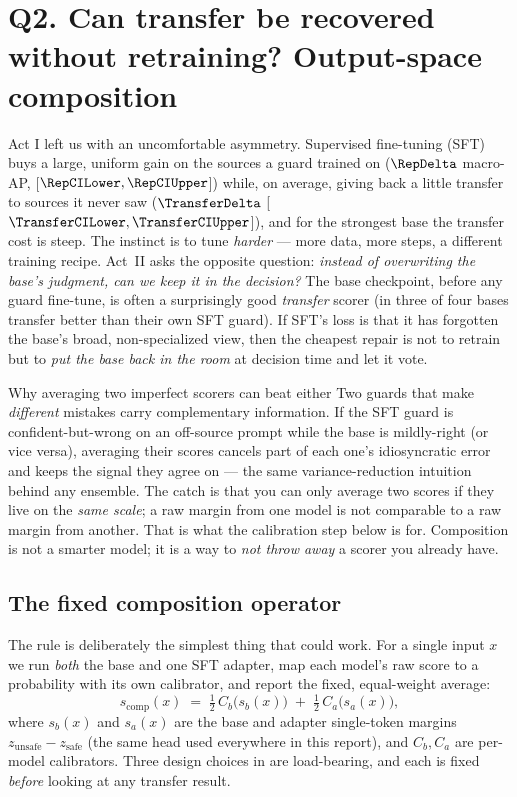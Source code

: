 \section{Q2. Can transfer be recovered without retraining? Output-space composition}
\label{sec:actIII}

Act I left us with an uncomfortable asymmetry. Supervised fine-tuning (SFT) buys a large,
uniform gain on the sources a guard trained on ($\RepDelta$ macro-AP,
[$\RepCILower,\RepCIUpper$]) while, on average, giving back a little transfer to sources it
never saw ($\TransferDelta$ [$\TransferCILower,\TransferCIUpper$]), and for the strongest
base the transfer cost is steep. The instinct is to tune \emph{harder} --- more data, more
steps, a different training recipe. Act~II asks the opposite question:
\emph{instead of overwriting the base's judgment, can we keep it in the decision?} The base
checkpoint, before any guard fine-tune, is often a surprisingly good \emph{transfer} scorer
(in  three of four bases transfer better than their own SFT guard). If SFT's
loss is that it has forgotten the base's broad, non-specialized view, then the cheapest repair
is not to retrain but to \emph{put the base back in the room} at decision time and let it vote.

\begin{background}{Why averaging two imperfect scorers can beat either}
Two guards that make \emph{different} mistakes carry complementary information. If the SFT guard
is confident-but-wrong on an off-source prompt while the base is mildly-right (or vice versa),
averaging their scores cancels part of each one's idiosyncratic error and keeps the signal they
agree on --- the same variance-reduction intuition behind any ensemble. The catch is that you
can only average two scores if they live on the \emph{same scale}; a raw margin from one model
is not comparable to a raw margin from another. That is what the calibration step below is for.
Composition is not a smarter model; it is a way to \emph{not throw away} a scorer you already
have.
\end{background}

\subsection{The fixed composition operator}
\label{sec:actIII-operator}

The rule is deliberately the simplest thing that could work. For a single input $x$ we run
\emph{both} the base and one SFT adapter, map each model's raw score to a probability with its
own calibrator, and report the fixed, equal-weight average:
\begin{equation}
s_{\mathrm{comp}}(x) \;=\; \tfrac12\, C_b\!\big(s_b(x)\big) \;+\; \tfrac12\, C_{a}\!\big(s_{a}(x)\big),
\label{eq:comp}
\end{equation}
where $s_b(x)$ and $s_a(x)$ are the base and adapter single-token margins
$z_{\text{unsafe}}-z_{\text{safe}}$ (the same head used everywhere in this report), and
$C_b,C_a$ are per-model calibrators. Three design choices in  are load-bearing,
and each is fixed \emph{before} looking at any transfer result.

